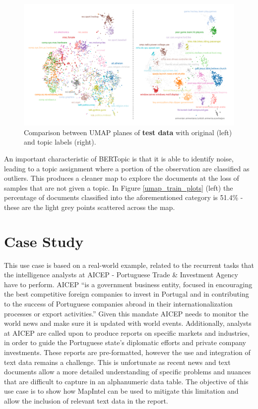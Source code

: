 \documentclass[a4paper]{article}
\begin{document}
\begin{figure}[H]
	\centering
	\includegraphics[width=\linewidth]{./assets/umap_test_plots}
	\caption{Comparison between UMAP planes of \textbf{test data} with original (left) and topic labels (right).}
	\label{umap_test_plots}
\end{figure}

An important characteristic of BERTopic is that it is able to identify noise, leading to a topic assignment where a portion of the observation are classified as outliers. This produces a cleaner map to explore the documents at the loss of samples that are not given a topic. In Figure \ref{umap_train_plots} (left) the percentage of documents classified into the aforementioned category is 51.4\% - these are the light grey points scattered across the map.

\section{Case Study}
This use case is based on a real-world example, related to the recurrent tasks that the intelligence analysts at AICEP - Portuguese Trade \& Investment Agency have to perform. AICEP “is a government business entity, focused in encouraging the best competitive foreign companies to invest in Portugal and in contributing to the success of Portuguese companies abroad in their internationalization processes or export activities.” Given this mandate AICEP needs to monitor the world news and make sure it is updated with world events. Additionally, analysts at AICEP are called upon to produce reports on specific markets and industries, in order to guide the Portuguese state's diplomatic efforts and private company investments. These reports are pre-formatted, however the use and integration of text data remains a challenge. This is unfortunate as recent news and text documents allow a more detailed understanding of specific problems and nuances that are difficult to capture in an alphanumeric data table. The objective of this use case is to show how MapIntel can be used to mitigate this limitation and allow the inclusion of relevant text data in the report.
\end{document}
